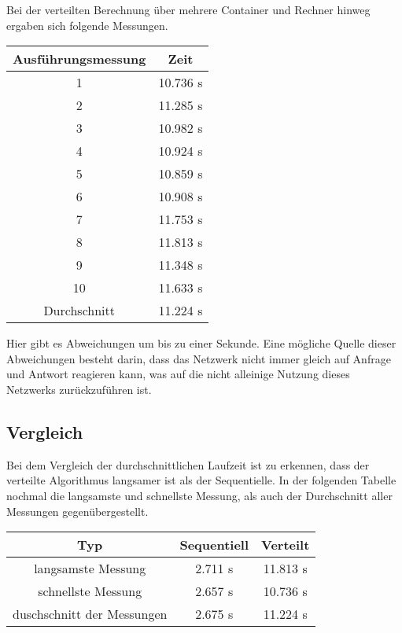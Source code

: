 Bei der verteilten Berechnung über mehrere Container und Rechner hinweg ergaben sich folgende Messungen.

\begin{center}
    \begin{tabular}{ |c|c| }
        \hline
        Ausführungsmessung & Zeit     \\
        \hline
        1                  & 10.736 s \\
        2                  & 11.285 s \\
        3                  & 10.982 s \\
        4                  & 10.924 s \\
        5                  & 10.859 s \\
        6                  & 10.908 s \\
        7                  & 11.753 s \\
        8                  & 11.813 s \\
        9                  & 11.348 s \\
        10                 & 11.633 s \\
        \hline
        Durchschnitt       & 11.224 s \\
        \hline
    \end{tabular}
\end{center}

Hier gibt es Abweichungen um bis zu einer Sekunde. Eine mögliche Quelle dieser Abweichungen besteht darin, dass das Netzwerk nicht immer gleich auf Anfrage und Antwort reagieren kann, was auf die nicht alleinige Nutzung dieses Netzwerks zurückzuführen ist.

\subsection{Vergleich}

Bei dem Vergleich der durchschnittlichen Laufzeit ist zu erkennen, dass der verteilte Algorithmus langsamer ist als der Sequentielle. In der folgenden Tabelle nochmal die langsamste und schnellste Messung, als auch der Durchschnitt aller Messungen gegenübergestellt.

\begin{center}
    \begin{tabular}{ |c|c|c| }
        \hline
        Typ                        & Sequentiell & Verteilt \\
        \hline
        langsamste Messung         & 2.711 s     & 11.813 s \\
        schnellste Messung         & 2.657 s     & 10.736 s \\
        duschschnitt der Messungen & 2.675 s     & 11.224 s \\
        \hline
    \end{tabular}
\end{center}

